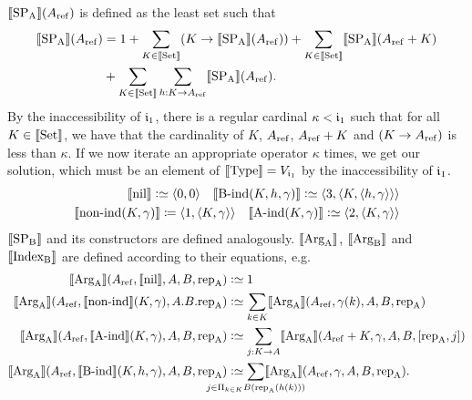 \documentclass{article}
\begin{document}
$\llbracket \text{SP}_{\mathrm{A}} \rrbracket(A_{\mathrm{ref}})$ is defined as the least set such that
\begin{align*}
\llbracket \text{SP}_{\mathrm{A}} \rrbracket(A_{\mathrm{ref}}) &= 1 + \sum_{K \in \llbracket \text{Set} \rrbracket}(K \to \llbracket \text{SP}_{\mathrm{A}} \rrbracket(A_{\mathrm{ref}}))
  + \sum_{K \in \llbracket \text{Set} \rrbracket}\llbracket \text{SP}_{\mathrm{A}} \rrbracket(A_{\mathrm{ref}} + K) \\
 & {} + \sum_{K \in \llbracket \text{Set} \rrbracket}\sum_{h : K \to A_{\mathrm{ref}}}\llbracket \text{SP}_{\mathrm{A}} \rrbracket(A_{\mathrm{ref}}).
\end{align*}
 By the inaccessibility of $\mathfrak{i}_1$, there is a
regular cardinal ${\kappa < \mathfrak{i}_1}$ such that for all $K \in \llbracket \text{Set} \rrbracket$, we
have that the cardinality of $K$, $A_{\mathrm{ref}}$, $A_{\mathrm{ref}} + K$ and $(K \to A_{\mathrm{ref}})$ is less than
$\kappa$. If we now iterate an appropriate operator $\kappa$ times, we get our
solution, which must be an element of $\llbracket \text{Type} \rrbracket = V_{\mathfrak{i}_1}$ by the
inaccessibility of $\mathfrak{i}_1$.
\begin{align*}
 \llbracket \text{nil} \rrbracket \mathrel{\mathop:}\simeq \langle 0, 0\rangle \quad
 \llbracket \text{B-ind}(K, h, \gamma) \rrbracket \mathrel{\mathop:}\simeq \langle 3 , \langle K, \langle h, \gamma \rangle\rangle\rangle
   \\
  \llbracket \text{non-ind}(K, \gamma) \rrbracket \coloneqq \langle 1 , \langle K, \gamma
  \rangle\rangle \quad \llbracket \text{A-ind}(K, \gamma) \rrbracket \mathrel{\mathop:}\simeq \langle 2 , \langle K, \gamma \rangle\rangle
\end{align*}
$\llbracket \text{SP}_{\mathrm{B}} \rrbracket$ and its constructors are defined
analogously. $\llbracket \text{Arg}_{\mathrm{A}} \rrbracket$, $\llbracket \text{Arg}_{\mathrm{B}} \rrbracket$ and $\llbracket \text{Index}_{\mathrm{B}} \rrbracket$ are defined according to their equations,
e.g.\ 
\begin{align*}
  \sem{\ArgA}(\Aref, \sem{\nilA}, A, B, \repA) &\colonsimeq 1 \\
\sem{\ArgA}(\Aref, \sem{\nonindA}(K, \gamma), A. B. \repA) &\colonsimeq
  \sum_{k \in K} \sem{\ArgA}(\Aref, \gamma(k), A, B, \repA) \\
\sem{\ArgA}(\Aref, \sem{\AindA}(K, \gamma), A, B, \repA) &\colonsimeq
  \sum_{j : K \to A}\sem{\ArgA}(\Aref + K, \gamma, A, B, [\repA, j]) \\
\sem{\ArgA}(\Aref, \sem{\BindA}(K, h, \gamma), A, B, \repA) &\colonsimeq
  \sum_{\mathclap{j \in \Pi_{k \in K} B(\repA (h(k)))}}\sem{\ArgA}(\Aref, \gamma, A, B, \repA).
\end{align*}
%
%
\end{document}
